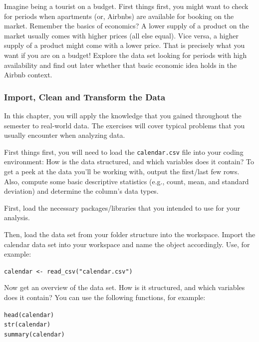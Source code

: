 \documentclass[
  11pt,
]{article}
\newenvironment{tips}[1]
  {
  \begin{itemize}
  \footnotesize
  \renewcommand{\labelitemi}{
    \raisebox{-.7\height}[0pt][0pt]{
      {\setkeys{Gin}{width=3em,keepaspectratio}
        \texttt{[image: images/\#1.png]}}
    }
  }
  \setlength{\fboxsep}{1em}
  \begin{rbox}
  \item
  }
  {
  \end{rbox}
  \end{itemize}
  }
\begin{document}
Imagine being a tourist on a budget.
First things first, you might want to check for periods when apartments (or, Airbnbs) are available for booking on the market.
Remember the basics of economics?
A lower supply of a product on the market usually comes with higher prices (all else equal).
Vice versa, a higher supply of a product might come with a lower price.
That is precisely what you want if you are on a budget!
Explore the data set looking for periods with high availability and find out later whether that basic economic idea holds in the Airbnb context.

\hypertarget{import-clean-and-transform-the-data}{%
\subsubsection{Import, Clean and Transform the Data}\label{import-clean-and-transform-the-data}}

In this chapter, you will apply the knowledge that you gained throughout the semester to real-world data.
The exercises will cover typical problems that you usually encounter when analyzing data.

First things first, you will need to load the \texttt{calendar.csv} file into your coding environment: How is the data structured, and which variables does it contain?
To get a peek at the data you'll be working with, output the first/last few rows.
Also, compute some basic descriptive statistics (e.g., count, mean, and standard deviation) and determine the column's data types.

\begin{tips}r
First, load the necessary packages/libraries that you intended to use for your analysis.

Then, load the data set from your folder structure into the workspace.
Import the calendar data set into your workspace and name the object accordingly.
Use, for example:

\texttt{calendar\ \textless{}-\ read\_csv("calendar.csv")}

Now get an overview of the data set.
How is it structured, and which variables does it contain?
You can use the following functions, for example:

\texttt{head(calendar)}~\\
\texttt{str(calendar)}~\\
\texttt{summary(calendar)}

\end{tips}
\end{document}
